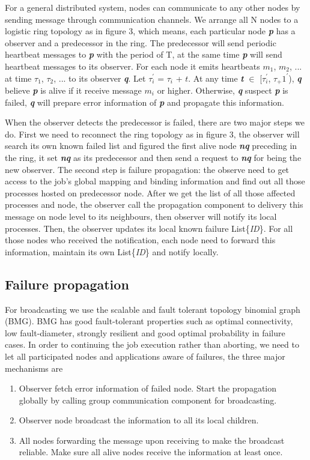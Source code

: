\documentclass[sigconf]{acmart}
\begin{document}
For a general distributed system, nodes can communicate to any other nodes by sending message through communication channels. We arrange all N nodes to a logistic ring topology as in figure 3, which means, each particular node \textbf{\textit{p}} has a observer and a predecessor in the ring. The predecessor will send periodic heartbeat messages to \textbf{\textit{p}} with the period of T, at the same time \textbf{\textit{p}} will send heartbeat messages to its observer. For each node it emits heartbeats $m_1$, $m_2$, ... at time ${\tau_1}$, ${\tau_2}$, ... to its observer \textbf{\textit{q}}. Let ${\tau_i^'}$ = ${\tau_i}$ + $t$. At any time \textbf{\textit{t}} $\in$ [${\tau_i^'}$, ${\tau_+1^'}$), \textbf{\textit{q}} believe \textbf{\textit{p}} is alive if it receive message $m_i$ or higher. Otherwise, \textbf{\textit{q}} suspect \textbf{\textit{p}} is failed, \textbf{\textit{q}} will prepare error information of \textbf{\textit{p}} and propagate this information. 

When the observer detects the predecessor is failed, there are two major steps we do. First we need to reconnect the ring topology as in figure 3, the observer will search its own known failed list and figured the first alive node \textbf{\textit{nq}} preceding in the ring, it set \textbf{\textit{nq}} as its predecessor and then send a request to \textbf{\textit{nq}} for being the new observer. The second step is failure propagation: the observe need to get access to the job's global mapping and binding information and find out all those processes hosted on predecessor node. After we get the list of all those affected processes and node, the observer call the propagation component to delivery this message on node level to its neighbours, then observer will notify its local processes. Then, the observer updates its local known failure List\{\textit{ID}\}. For all those nodes who received the notification, each node need to forward this information, maintain its own List\{\textit{ID}\} and notify locally. 

\subsection{Failure propagation}
For broadcasting we use the scalable and fault tolerant topology binomial graph (BMG)\cite{Angskun07}. BMG has good fault-tolerant properties such as optimal connectivity, low fault-diameter, strongly resilient and good optimal probability in failure cases. In order to continuing the job execution rather than aborting, we need to let all participated nodes and applications aware of failures, the three major mechanisms are 
\begin{enumerate}
  \item Observer fetch error information of failed node. Start the propagation globally by calling group communication component for broadcasting.
  \item Observer node broadcast the information to all its local children. 
  \item All nodes forwarding the message upon receiving to make the broadcast reliable. Make sure all alive nodes receive the information at least once. 
\end{enumerate}
\end{document}
